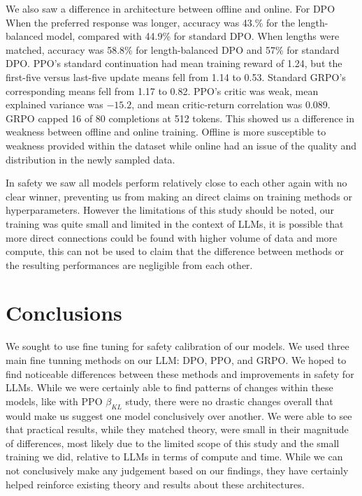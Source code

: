 \documentclass{article}
\begin{document}
We also saw a difference in architecture between offline and online. For DPO When the preferred response was longer, accuracy was 43.\% for the length-balanced model, compared with 44.9\% for standard DPO.
When lengths were matched, accuracy was 58.8\% for length-balanced DPO and 57\% for standard DPO. PPO's standard continuation had mean training reward of 1.24, but the first-five versus last-five update means fell from 1.14 to 0.53.
Standard GRPO's corresponding means fell from 1.17 to 0.82. PPO's critic was weak, mean explained variance was \(-15.2\), and mean critic-return correlation was 0.089. GRPO capped 16 of 80 completions at 512 tokens.
This showed us a difference in weakness between offline and online training. Offline is more susceptible to weakness provided within the dataset while online had an issue of the quality and distribution in the
newly sampled data.

In safety we saw all models perform relatively close to each other again with no clear winner, preventing us from making an direct claims on training methods or hyperparameters. However the limitations of this study
should be noted, our training was quite small and limited in the context of LLMs, it is possible that more direct connections could be found with higher volume of data and more compute, this can not be used to claim that
the difference between methods or the resulting performances are negligible from each other.

\section{Conclusions}

We sought to use fine tuning for safety calibration of our models. We used three main fine tunning methods on our LLM: DPO, PPO, and GRPO. We hoped to find noticeable differences between these methods and improvements in safety
for LLMs. While we were certainly able to find patterns of changes within these models, like with PPO $\beta_{KL}$ study, there were no drastic changes overall that would make us suggest one model conclusively over another. We were able
to see that practical results, while they matched theory, were small in their magnitude of differences, most likely due to the limited scope of this study and the small training we did, relative to LLMs in terms of compute and time.
While we can not conclusively make any judgement based on our findings, they have certainly helped reinforce existing theory and results about these architectures.
\end{document}
